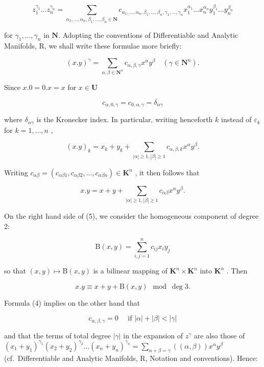 \[
z _ {1} ^ {\gamma_ {1}} \dots z _ {n} ^ {\gamma_ {n}} = \sum_ {\alpha_ {1},\dots,\alpha_ {n},\beta_ {1},\dots,\beta_ {n} \in \mathbf {N}} c _ {\alpha_ {1},\dots,\alpha_ {n},\beta_ {1},\dots,\beta_ {n},\gamma_ {1},\dots,\gamma_ {n}} x _ {1} ^ {\alpha_ {1}} \dots x _ {n} ^ {\alpha_ {n}} y _ {1} ^ {\beta_ {1}} \dots y _ {n} ^ {\beta_ {n}}\tag{1}
\]

for \(\gamma_{1},\ldots,\gamma_{n}\) in \(\mathbf{N}\). Adopting the conventions of Differentiable and Analytic Manifolds, R, we shall write these formulae more briefly:

\[
(x. y) ^ {\gamma} = \sum_ {\alpha , \beta \in \mathbf {N} ^ {n}} c _ {\alpha , \beta , \gamma} x ^ {\alpha} y ^ {\beta} \quad (\gamma \in \mathbf {N} ^ {n}).\tag{2}
\]

Since \(x.0 = 0.x = x\) for \(x\in \mathbf{U}\)

\[
c _ {\alpha , 0, \gamma} = c _ {0, \alpha , \gamma} = \delta_ {\alpha \gamma}\tag{3}
\]

where \(\delta_{\alpha \gamma}\) is the Kronecker index. In particular, writing henceforth \(k\) instead of \(\varepsilon_k\) for \(k = 1, \ldots, n\) ,

\[
(x. y) _ {k} = x _ {k} + y _ {k} + \sum_ {| \alpha | \geqslant 1, | \beta | \geqslant 1} c _ {\alpha , \beta , k} x ^ {\alpha} y ^ {\beta}.\tag{4}
\]

Writing \(c_{\alpha \beta} = (c_{\alpha \beta 1}, c_{\alpha \beta 2}, \ldots, c_{\alpha \beta n}) \in \mathbf{K}^n\) , it then follows that

\[
x. y = x + y + \sum_ {| \alpha | \geqslant 1, | \beta | \geqslant 1} c _ {\alpha \beta} x ^ {\alpha} y ^ {\beta}.\tag{5}
\]

On the right hand side of (5), we consider the homogeneous component of degree 2:

\[
\mathrm{B} (x, y) = \sum_ {i, j = 1} ^ {n} c _ {i j} x _ {i} y _ {j}
\]

so that \((x,y)\mapsto \mathrm{B}(x,y)\) is a bilinear mapping of \(\mathbf{K}^n\times \mathbf{K}^n\) into \(\mathbf{K}^n\) . Then

\[
x. y \equiv x + y + \mathrm{B} (x, y) \mod \deg 3.\tag{6}
\]

Formula (4) implies on the other hand that

\[
c _ {\alpha , \beta , \gamma} = 0 \quad \text { if } | \alpha | + | \beta | <   | \gamma |\tag{7}
\]

and that the terms of total degree \(|\gamma|\) in the expansion of \(z^\gamma\) are also those of \((x_1 + y_1)^{\gamma_1}(x_2 + y_2)^{\gamma_2} \ldots (x_n + y_n)^{\gamma_n} = \sum_{\alpha + \beta = \gamma} ((\alpha, \beta)) x^\alpha y^\beta\) (cf.~Differentiable and Analytic Manifolds, R, Notation and conventions). Hence:

